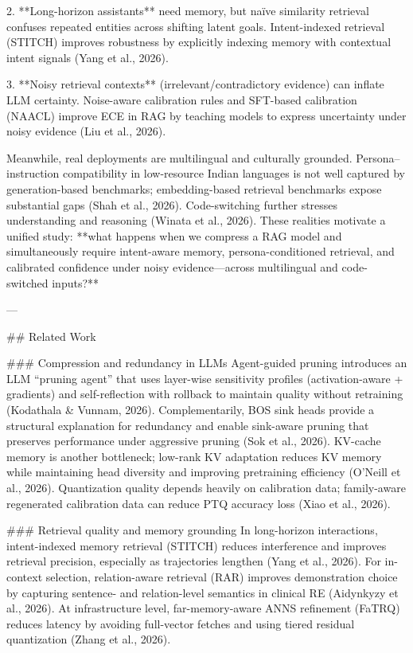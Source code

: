 2. **Long-horizon assistants** need memory, but naïve similarity retrieval confuses repeated entities across shifting latent goals. Intent-indexed retrieval (STITCH) improves robustness by explicitly indexing memory with contextual intent signals (Yang et al., 2026).

3. **Noisy retrieval contexts** (irrelevant/contradictory evidence) can inflate LLM certainty. Noise-aware calibration rules and SFT-based calibration (NAACL) improve ECE in RAG by teaching models to express uncertainty under noisy evidence (Liu et al., 2026).

Meanwhile, real deployments are multilingual and culturally grounded. Persona–instruction compatibility in low-resource Indian languages is not well captured by generation-based benchmarks; embedding-based retrieval benchmarks expose substantial gaps (Shah et al., 2026). Code-switching further stresses understanding and reasoning (Winata et al., 2026). These realities motivate a unified study: **what happens when we compress a RAG model and simultaneously require intent-aware memory, persona-conditioned retrieval, and calibrated confidence under noisy evidence—across multilingual and code-switched inputs?**

---

## Related Work  

### Compression and redundancy in LLMs  
Agent-guided pruning introduces an LLM “pruning agent” that uses layer-wise sensitivity profiles (activation-aware + gradients) and self-reflection with rollback to maintain quality without retraining (Kodathala & Vunnam, 2026). Complementarily, BOS sink heads provide a structural explanation for redundancy and enable sink-aware pruning that preserves performance under aggressive pruning (Sok et al., 2026). KV-cache memory is another bottleneck; low-rank KV adaptation reduces KV memory while maintaining head diversity and improving pretraining efficiency (O’Neill et al., 2026). Quantization quality depends heavily on calibration data; family-aware regenerated calibration data can reduce PTQ accuracy loss (Xiao et al., 2026).

### Retrieval quality and memory grounding  
In long-horizon interactions, intent-indexed memory retrieval (STITCH) reduces interference and improves retrieval precision, especially as trajectories lengthen (Yang et al., 2026). For in-context selection, relation-aware retrieval (RAR) improves demonstration choice by capturing sentence- and relation-level semantics in clinical RE (Aidynkyzy et al., 2026). At infrastructure level, far-memory-aware ANNS refinement (FaTRQ) reduces latency by avoiding full-vector fetches and using tiered residual quantization (Zhang et al., 2026).

